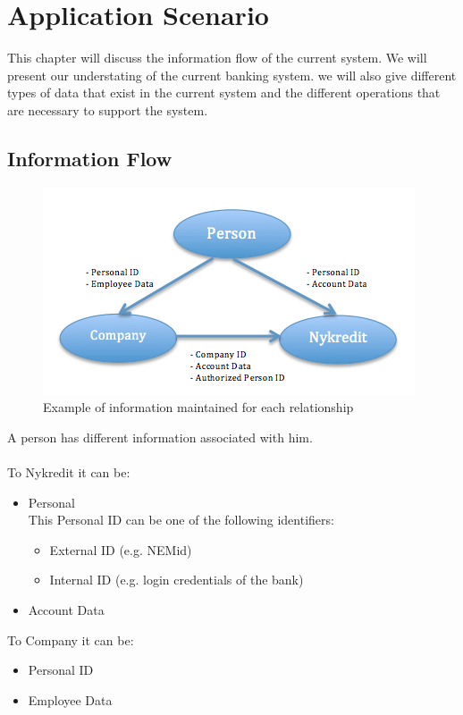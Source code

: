 \chapter{Application Scenario}

This chapter will discuss the information flow of the current system. We will present our understating of the current banking system. we will also give different types of data that exist in the current system and the different operations that are necessary to support the system.
\section{Information Flow}
\begin{figure}[h]
	\centering
	\includegraphics[width=\textwidth]{figures/Flow}
	\caption{Example of information maintained for each relationship}
	\label{fig:Flow}
\end{figure}
A person has different information associated with him. 
\\
\\To Nykredit it can be:
\begin{itemize}
	\item Personal
	 \\This Personal ID can be one of the following identifiers:
	\begin{itemize}
		\item	External ID (e.g. NEMid)
		\item Internal ID (e.g. login credentials of the bank)
	\end{itemize}
\item Account Data
\end{itemize}
To Company it can be:
\begin{itemize}
	\item Personal ID
	\item Employee Data
\end{itemize}

